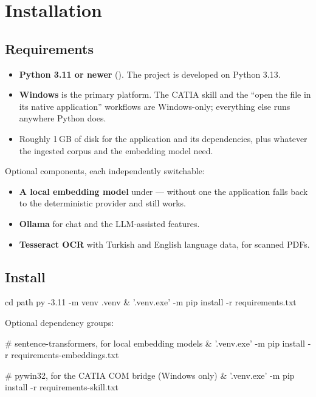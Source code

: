 \chapter{Installation}
\label{ch:installation}

\section{Requirements}

\begin{itemize}
\item \textbf{Python 3.11 or newer} (). The
project is developed on Python 3.13.
\item \textbf{Windows} is the primary platform. The CATIA skill and the
``open the file in its native application'' workflows are Windows-only;
everything else runs anywhere Python does.
\item Roughly 1\,GB of disk for the application and its dependencies, plus
whatever the ingested corpus and the embedding model need.
\end{itemize}

Optional components, each independently switchable:

\begin{itemize}
\item \textbf{A local embedding model} under  --- without one the
application falls back to the deterministic  provider and still
works.
\item \textbf{Ollama} for chat and the LLM-assisted features.
\item \textbf{Tesseract OCR} with Turkish and English language data, for
scanned PDFs.
\end{itemize}

\section{Install}

\begin{shellblock}
cd path\to\ucak
py -3.11 -m venv .venv
& '.venv\Scripts\python.exe' -m pip install -r requirements.txt
\end{shellblock}

Optional dependency groups:

\begin{shellblock}
# sentence-transformers, for local embedding models
& '.venv\Scripts\python.exe' -m pip install -r requirements-embeddings.txt

# pywin32, for the CATIA COM bridge (Windows only)
& '.venv\Scripts\python.exe' -m pip install -r requirements-skill.txt
\end{shellblock}

